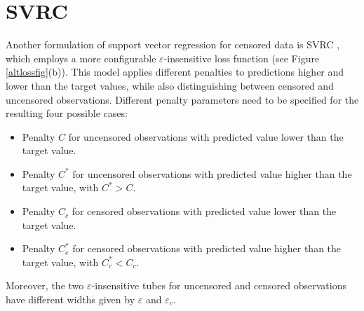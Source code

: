 \documentclass[12pt]{report}
\begin{document}
\section{SVRC}
Another formulation of support vector regression for censored data is SVRC \cite{khan08}, which employs a more configurable $\varepsilon$-insensitive loss function (see Figure \ref{altlossfig}(b)). This model applies different penalties to predictions higher and lower than the target values, while also distinguishing between censored and uncensored observations. Different penalty parameters need to be specified for the resulting four possible cases:
\begin{itemize}
\item Penalty $C$ for uncensored observations with predicted value lower than the target value.
\item Penalty $C^{*}$ for uncensored observations with predicted value higher than the target value, with $C^{*} > C$.
\item Penalty $C_{c}$ for censored observations with predicted value lower than the target value.
\item Penalty $C_{c}^{*}$ for censored observations with predicted value higher than the target value, with $C_{c}^{*} < C_{c}$.
\end{itemize}

Moreover, the two $\varepsilon$-insensitive tubes for uncensored and censored observations have different widths given by $\varepsilon$ and $\varepsilon_{c}$.
\end{document}
